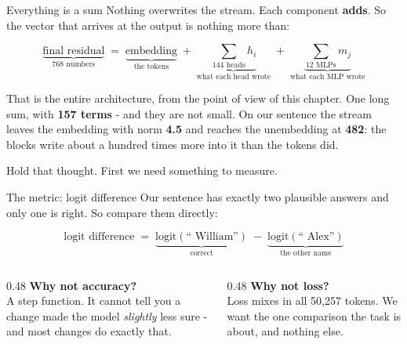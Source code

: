 \documentclass[aspectratio=169]{beamer}
\begin{document}
\begin{frame}{Everything is a sum}
  \vspace{1.4em}
  Nothing overwrites the stream. Each component \textbf{adds}. So the vector that arrives at the
  output is nothing more than:

  \vspace{1.2em}
  \[
    \underbrace{\text{final residual}}_{\text{768 numbers}} \;=\;
    \underbrace{\text{embedding}}_{\text{the tokens}} \;+\;
    \underbrace{\sum_{\text{144 heads}} h_i}_{\text{what each head wrote}} \;+\;
    \underbrace{\sum_{\text{12 MLPs}} m_j}_{\text{what each MLP wrote}}
  \]

  \vspace{0.9em}
  That is the entire architecture, from the point of view of this chapter. One long sum, with
  \textbf{157 terms} - and they are not small. On our sentence the stream leaves the embedding
  with norm \textbf{4.5} and reaches the unembedding at \textbf{482}: the blocks write about a
  hundred times more into it than the tokens did.

  \vspace{0.6em}
  Hold that thought. First we need something to measure.
\end{frame}

\begin{frame}{The metric: logit difference}
  \vspace{0.7em}
  Our sentence has exactly two plausible answers and only one is right. So compare them
  directly:

  \vspace{0.7em}
  \[
    \text{logit difference} \;=\;
      \underbrace{\text{logit}(\text{`` William''})}_{\text{correct}} \;-\;
      \underbrace{\text{logit}(\text{`` Alex''})}_{\text{the other name}}
  \]

  \vspace{1.0em}
  \begin{columns}[T]
    \begin{column}{0.48\textwidth}
      \textbf{Why not accuracy?}\\[0.3em]
      \small A step function. It cannot tell you a change made the model \emph{slightly} less
      sure - and most changes do exactly that.
    \end{column}
    \begin{column}{0.48\textwidth}
      \textbf{Why not loss?}\\[0.3em]
      \small Loss mixes in all 50{,}257 tokens. We want the one comparison the task is about,
      and nothing else.
    \end{column}
  \end{columns}
\end{frame}
\end{document}
